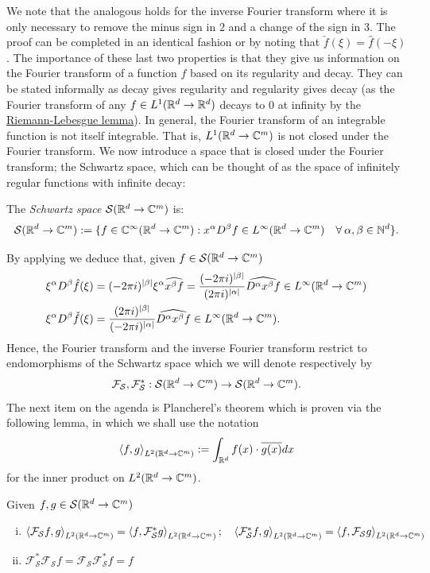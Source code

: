 \documentclass[
    a4paper,
    DIV=14,
    abstract=true,
    numbers=noenddot
]{scrartcl}
\begin{document}
We note that the analogous holds for the inverse Fourier transform where it is only necessary to remove the minus sign in $2$ and a change of the sign in $3$. The proof can be completed
in an identical fashion or by noting that $\check{f}(\xi )=\hat{f}(-\xi )$.
\bigbreak
The importance of these last two properties is that they give us information on the Fourier transform of a function $f$ based on its regularity and decay. They can be stated informally as decay gives regularity and regularity gives decay (as the Fourier transform of any $f\in L^1(\mathbb{R}^d\to\mathbb{R}^d)$ decays to 0 at infinity by the \href{https://en.wikipedia.org/wiki/Riemann%E2%80%93Lebesgue_lemma}{Riemann-Lebesgue lemma}).\bigbreak
In general, the Fourier transform of an integrable function is not itself integrable. That is, $L^1(\mathbb{R}^d\to\mathbb{C}^m)$ is not closed under the Fourier transform. We now introduce a space that is closed under the Fourier transform; the Schwartz space, which can be thought of as the space of infinitely regular functions with infinite decay: \bigbreak
\begin{definition}\label{Schwartz space definition}
	The \emph{Schwartz space} $\mathcal{S}(\mathbb{R}^d\to\mathbb{C}^m)$ is:
	\[\mathcal{S}(\mathbb{R}^d\to\mathbb{C}^m):=\lbrace f\in\mathbb{C}^\infty(\mathbb{R}^d\to\mathbb{C}^m):x^\alpha D^\beta f\in L^\infty(\mathbb{R}^d\to\mathbb{C}^m)\quad\forall\hspace{2pt}\alpha,\beta\in \mathbb{N}^d\rbrace.\]
\end{definition}
By applying  we deduce that, given $f\in\mathcal{S}(\mathbb{R}^d\to\mathbb{C}^m)$
\begin{align}\label{rdft}
	\xi^\alpha D^\beta \hat{f}(\xi)   & =(-2\pi i)^{{\left| \beta \right|}}\xi^{\alpha}\widehat{x^{\beta}f}=\frac{(-2\pi i)^{{\left| \beta \right|}}}{(2\pi i)^{{\left| \alpha \right|}}}\widehat{D^{\alpha}x^{\beta}f}\in L^\infty(\mathbb{R}^d\to\mathbb{C}^m)\\
	\xi^\alpha D^\beta \check{f}(\xi) & =\frac{(2\pi i)^{{\left| \beta \right|}}}{(-2\pi i)^{{\left| \alpha \right|}}}\widehat{D^{\alpha}x^{\beta}f}\in L^\infty(\mathbb{R}^d\to\mathbb{C}^m).
\end{align}
Hence, the Fourier transform and the inverse Fourier transform restrict to endomorphisms of the Schwartz space which we will denote respectively by
\[\mathcal{F}_\mathcal{S},\mathcal{F}^*_\mathcal{S}:\mathcal{S}(\mathbb{R}^d\to\mathbb{C}^m)\to\mathcal{S}(\mathbb{R}^d\to\mathbb{C}^m).\]
The next item on the agenda is Plancherel's theorem which is proven via the following lemma, in which we shall use the notation\[\left\langle f,g\right\rangle_{L^2(\mathbb{R}^d\to\mathbb{C}^m)}:=\int_{\mathbb{R}^d}f(x)\cdot  \overline{g(x)} dx\] for the inner product on $L^2(\mathbb{R}^d\to\mathbb{C}^m)$.
\begin{lemma}\label{Planncherellemma}
	Given $f,g\in \mathcal{S}(\mathbb{R}^d\to\mathbb{C}^m)$ 
	\begin{enumerate}[i)]
		\item $\left\langle\mathcal{F}_\mathcal{S}f,g\right\rangle_{L^2(\mathbb{R}^d\to\mathbb{C}^m)}=\left\langle f,\mathcal{F}_\mathcal{S}^*g\right\rangle_{L^2(\mathbb{R}^d\to\mathbb{C}^m)};\quad\left\langle\mathcal{F}_\mathcal{S}^*f,g\right\rangle_{L^2(\mathbb{R}^d\to\mathbb{C}^m)}=\left\langle f,\mathcal{F}_\mathcal{S}g\right\rangle_{L^2(\mathbb{R}^d\to\mathbb{C}^m)}$\label{adjointft}
		\item $\mathcal{F}_\mathcal{S}^*\mathcal{F}_\mathcal{S}f=\mathcal{F}_\mathcal{S}\mathcal{F}_\mathcal{S}^*f=f$\label{inverseft}
	\end{enumerate}
\end{lemma}
\end{document}
